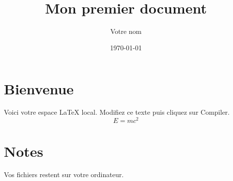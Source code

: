 \documentclass[12pt]{article}
\title{Mon premier document}
\author{Votre nom}
\date{\today}
\begin{document}
\maketitle
\section{Bienvenue}
Voici votre espace LaTeX local. Modifiez ce texte puis cliquez sur Compiler.
\[
  E = mc^2
\]
\section{Notes}
Vos fichiers restent sur votre ordinateur.
\end{document}

